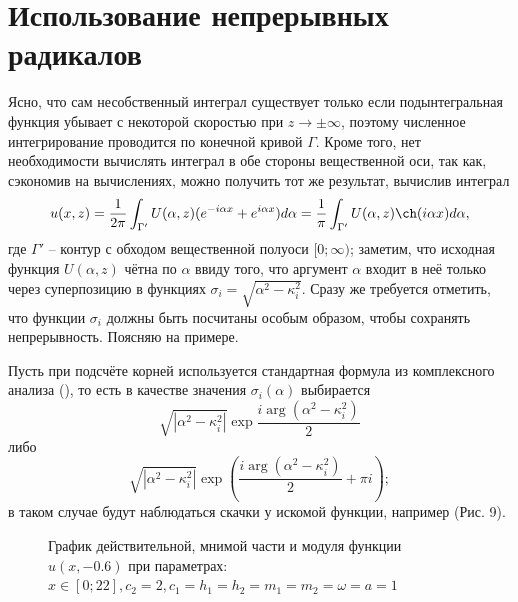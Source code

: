 \documentclass[a4paper, 12pt]{article}
\begin{document}
\section{Использование непрерывных радикалов}
Ясно, что сам несобственный интеграл существует только если подынтегральная функция убывает с некоторой скоростью при $z\rightarrow \pm \infty$, поэтому численное интегрирование проводится по конечной кривой $\Gamma$. Кроме того, нет необходимости вычислять интеграл в обе стороны вещественной оси, так как, сэкономив на вычислениях, можно получить тот же результат, вычислив интеграл
$$u(x,z) =\frac{1}{2\pi} \int_{\Gamma'} U(\alpha, z) (e^{-i \alpha x}+e^{i \alpha x}) d\alpha=\frac{1}{\pi}\int_{\Gamma'} U(\alpha, z) \ch (i \alpha x) d\alpha,$$
где $\Gamma'$ -- контур с обходом вещественной полуоси $[0;\infty)$; заметим, что исходная функция $U(\alpha,z)$ чётна по $\alpha$ ввиду того, что аргумент $\alpha$ входит в неё только через суперпозицию в функциях $\sigma_i = \sqrt{\alpha^2-\kappa^2_i}$. Сразу же требуется отметить, что функции $\sigma_i$ должны быть посчитаны особым образом, чтобы сохранять непрерывность. Поясняю на примере.

Пусть при подсчёте корней используется стандартная формула из комплексного анализа (\cite{tfkp, korn}), то есть в качестве значения $\sigma_i(\alpha)$ выбирается 
$$\sqrt{|\alpha^2-\kappa^2_i|}\exp{\dfrac{i \arg (\alpha^2-\kappa^2_i)}{2}}$$ 
либо
$$\sqrt{|\alpha^2-\kappa^2_i|}\exp\left({\dfrac{i \arg (\alpha^2-\kappa^2_i)}{2}+\pi i}\right);$$
в таком случае будут наблюдаться скачки у искомой функции, например (Рис. 9).
\begin{figure}[h!]
\noindent{}
\caption{График действительной, мнимой части и модуля функции $u(x,-0.6)$ при параметрах: $x \in [0;22], c_2=2, c_1=h_1=h_2=m_1=m_2=\omega=a=1$}
\label{figCurves}
\end{figure}
\end{document}
